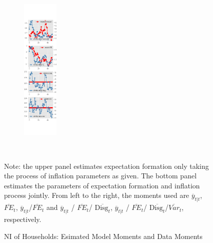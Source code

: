 \documentclass[]{article}
\begin{document}
\begin{figure}[ht]
\begin{subfigure}[b]{\textwidth}
		\includegraphics[width=0.19\textwidth]{figures/sce_ni_est_joint_diag4.png}
	\end{subfigure}
	\\
	\begin{flushleft}
		{\footnotesize Note: the upper panel estimates expectation formation only taking the process of inflation parameters as given. The bottom panel estimates the parameters of expectation formation and inflation process jointly. From left to the right, the moments used are $\overline y_{t|t}$, $\overline{FE}_{t}$, $\overline y_{t|t}$/$\overline{FE}_{t}$ and $\overline y_{t|t}$ / $\overline{FE}_{t}$/ $\overline{\textrm{Disg}_t}$, $\overline y_{t|t}$ / $\overline{FE}_{t}$/ $\overline{\textrm{Disg}_t}$/$\overline{Var}_t$,  respectively.  }
	\end{flushleft}
	\caption{NI of Households: Esimated Model Moments and Data Moments}
\end{figure}
\end{document}
